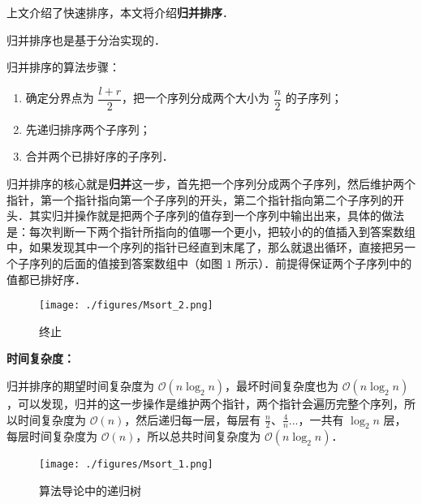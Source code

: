 
上文介绍了快速排序，本文将介绍\textbf{归并排序}．

归并排序也是基于分治实现的．

归并排序的算法步骤：
\begin{enumerate}
\item 确定分界点为 $\dfrac{l + r}{2}$，把一个序列分成两个大小为 $\dfrac{n}{2}$ 的子序列；
\item 先递归排序两个子序列；
\item 合并两个已排好序的子序列．
\end{enumerate}

归并排序的核心就是\textbf{归并}这一步，首先把一个序列分成两个子序列，然后维护两个指针，第一个指针指向第一个子序列的开头，第二个指针指向第二个子序列的开头．其实归并操作就是把两个子序列的值存到一个序列中输出出来，具体的做法是：每次判断一下两个指针所指向的值哪一个更小，把较小的的值插入到答案数组中，如果发现其中一个序列的指针已经直到末尾了，那么就退出循环，直接把另一个子序列的后面的值接到答案数组中（如图 $1$ 所示）．前提得保证两个子序列中的值都已排好序．

\begin{figure}[ht]
\centering
\texttt{[image: ./figures/Msort\_2.png]}
\caption{终止} \label{Msort_fig2}
\end{figure}

\textbf{时间复杂度：}

归并排序的期望时间复杂度为 $\mathcal{O}(n \log_2 n)$，最坏时间复杂度也为 $\mathcal{O}(n \log_2 n)$，可以发现，归并的这一步操作是维护两个指针，两个指针会遍历完整个序列，所以时间复杂度为 $\mathcal{O}(n)$，然后递归每一层，每层有 $\frac{n}{2}$、$\frac{4}{n}$...，一共有 $\log_2 n$ 层，每层时间复杂度为 $\mathcal{O}(n)$，所以总共时间复杂度为 $\mathcal{O}(n \log_2 n)$．

\begin{figure}[ht]
\centering
\texttt{[image: ./figures/Msort\_1.png]}
\caption{算法导论中的递归树} \label{Msort_fig1}
\end{figure}

